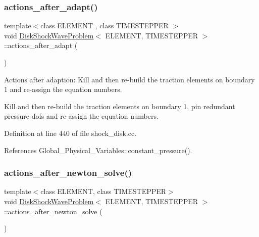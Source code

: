 \subsubsection{\texorpdfstring{actions\+\_\+after\+\_\+adapt()}{actions\_after\_adapt()}}
{\footnotesize\ttfamily template$<$class E\+L\+E\+M\+E\+NT , class T\+I\+M\+E\+S\+T\+E\+P\+P\+ER $>$ \\
void \hyperlink{classDiskShockWaveProblem}{Disk\+Shock\+Wave\+Problem}$<$ E\+L\+E\+M\+E\+NT, T\+I\+M\+E\+S\+T\+E\+P\+P\+ER $>$\+::actions\+\_\+after\+\_\+adapt (\begin{DoxyParamCaption}{ }\end{DoxyParamCaption})}



Actions after adaption\+: Kill and then re-\/build the traction elements on boundary 1 and re-\/assign the equation numbers. 

Kill and then re-\/build the traction elements on boundary 1, pin redundant pressure dofs and re-\/assign the equation numbers. 

Definition at line 440 of file shock\+\_\+disk.\+cc.



References Global\+\_\+\+Physical\+\_\+\+Variables\+::constant\+\_\+pressure().

\mbox{\label{classDiskShockWaveProblem_a46f6a25da58128f6abfdbbe92ea49d11}} 
\subsubsection{\texorpdfstring{actions\+\_\+after\+\_\+newton\+\_\+solve()}{actions\_after\_newton\_solve()}}
{\footnotesize\ttfamily template$<$class E\+L\+E\+M\+E\+NT, class T\+I\+M\+E\+S\+T\+E\+P\+P\+ER$>$ \\
void \hyperlink{classDiskShockWaveProblem}{Disk\+Shock\+Wave\+Problem}$<$ E\+L\+E\+M\+E\+NT, T\+I\+M\+E\+S\+T\+E\+P\+P\+ER $>$\+::actions\+\_\+after\+\_\+newton\+\_\+solve (\begin{DoxyParamCaption}{ }\end{DoxyParamCaption})\hspace{0.3cm}{\ttfamily [inline]}}



